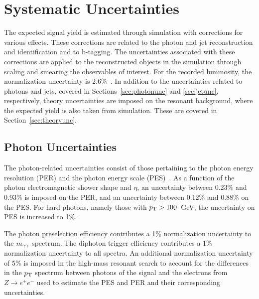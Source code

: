 \chapter{Systematic Uncertainties\label{ch:uncertainties}}

The expected signal yield is estimated through simulation with corrections for various effects.
These corrections are related to the photon and jet reconstruction and identification
and to b-tagging.
The uncertainties associated with these corrections are applied to the reconstructed objects in
the simulation through scaling and smearing the observables of interest.
For the recorded luminosity, the normalization uncertainty is 2.6\%~\cite{CMS-PAS-LUM-13-001}.
In addition to the uncertainties related to photons and jets, covered in
Sections~\ref{sec:photonunc} and \ref{sec:jetunc}, respectively, theory uncertainties are imposed
on the resonant background, where the expected yield is also taken from simulation. These are covered
in Section~\ref{sec:theoryunc}.


\section{Photon Uncertainties\label{sec:photonunc}}

The photon-related uncertainties consist of those pertaining to the photon energy resolution (PER)
and the photon energy scale (PES)~\cite{CMS-PAS-HIG-13-001}. As a function of the photon
electromagnetic shower shape and $\eta$,
an uncertainty between 0.23\% and 0.93\% is imposed on the PER,
and an uncertainty between 0.12\% and 0.88\% on the PES. For hard photons, namely those with
$p_{{\rm T}} > 100$~GeV, the uncertainty on PES is increased to 1\%.

The photon preselection efficiency contributes a 1\% normalization uncertainty to the $m_{\gamma\gamma}$
spectrum. The diphoton trigger efficiency contributes a 1\% normalization
uncertainty to all spectra.
An additional normalization uncertainty of 5\% is imposed in the high-mass resonant search
to account for the differences in the $p_{\rm T}$ spectrum between photons of the signal
and the electrons from $Z\rightarrow e^+ e^-$ used to estimate the PES and PER and their
corresponding uncertainties.

